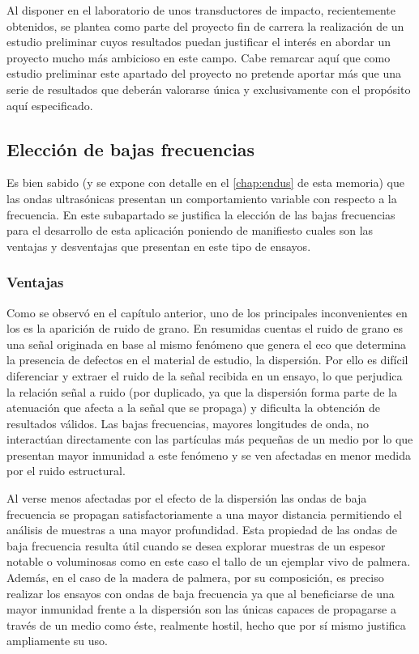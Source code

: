 Al disponer en el laboratorio de unos transductores de impacto,
recientemente obtenidos, se plantea como parte del proyecto fin de carrera
la realización de un estudio preliminar cuyos resultados puedan justificar
el interés en abordar un proyecto mucho más ambicioso en este campo. Cabe
remarcar aquí que como estudio preliminar este apartado del proyecto no
pretende aportar más que una serie de resultados que deberán valorarse
única y exclusivamente con el propósito aquí especificado.


\subsection{Elección de bajas frecuencias}

Es bien sabido (y se expone con detalle en el \vref{chap:endus} de esta
memoria) que las ondas ultrasónicas presentan un comportamiento variable
con respecto a la frecuencia. En este subapartado se justifica la elección
de las bajas frecuencias para el desarrollo de esta aplicación poniendo de
manifiesto cuales son las ventajas y desventajas que presentan en este tipo
de ensayos.


\subsubsection{Ventajas}

Como se observó en el capítulo anterior, uno de los principales
inconvenientes en los  es la aparición de ruido de grano. En
resumidas cuentas el ruido de grano es una señal originada en base al mismo
fenómeno que genera el eco que determina la presencia de defectos en el
material de estudio, la dispersión. Por ello es difícil diferenciar y
extraer el ruido de la señal recibida en un ensayo, lo que perjudica la
relación señal a ruido (por duplicado, ya que la dispersión forma parte de
la atenuación que afecta a la señal que se propaga) y dificulta la
obtención de resultados válidos. Las bajas frecuencias, mayores longitudes
de onda, no interactúan directamente con las partículas más pequeñas de un
medio por lo que presentan mayor inmunidad a este fenómeno y se ven
afectadas en menor medida por el ruido estructural.

Al verse menos afectadas por el efecto de la dispersión las ondas de baja
frecuencia se propagan satisfactoriamente a una mayor distancia permitiendo
el análisis de muestras a una mayor profundidad. Esta propiedad de las
ondas de baja frecuencia resulta útil cuando se desea explorar muestras de
un espesor notable o voluminosas como en este caso el tallo de un ejemplar
vivo de palmera. Además, en el caso de la madera de palmera, por su
composición, es preciso realizar los ensayos con ondas de baja frecuencia
ya que al beneficiarse de una mayor inmunidad frente a la dispersión son
las únicas capaces de propagarse a través de un medio como éste, realmente
hostil, hecho que por sí mismo justifica ampliamente su uso.


